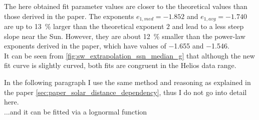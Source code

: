 The here obtained fit parameter values are closer to the theoretical values than those derived in the paper. The exponents $e_{1, med} = -1.852$ and $e_{1, avg} = -1.740$ are up to \SI{13}{\%} larger than the theoretical exponent $2$ and lead to a less steep slope near the Sun. However, they are about \SI{12}{\%} smaller than the power-law exponents derived in the paper, which have values of \num{-1.655} and \num{-1.546}.\\

It can be seen from \autoref{fig:sw_extrapolation_ssn_median_g} that although the new fit curve is slightly curved, both fits are congruent in the Helios data range.\\ 
\begin{figure}[htb]
\end{figure}

In the following paragraph I use the same method and reasoning as explained in the paper \autoref{sec:paper_solar_distance_dependency}, thus I do not go into detail here.\\

...and it can be fitted via a lognormal function\\

% 
% 
% 


